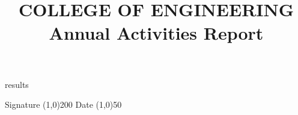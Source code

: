 \documentclass{article}
\begin{document}
\title{COLLEGE OF ENGINEERING \newline Annual Activities Report}
\date{}
\maketitle
{{results}}
\vspace{2in}
\begin{center}
Signature
\line(1,0){200} 
\hspace{2em}
Date
\line(1,0){50}
\end{center}
\end{document}
